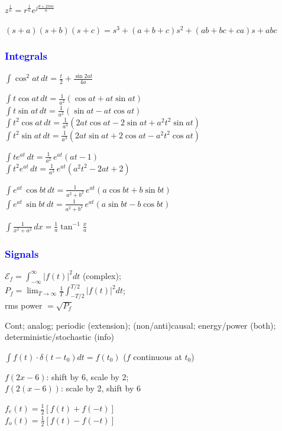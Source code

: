 \documentclass[4pt]{article}
\theoremstyle{definition}
\theoremstyle{definition}
\newcommand{\ra}{\rightarrow}
\newcommand{\blue}[1]{\textcolor{blue}{#1}}
\begin{document}
\begin{landscape}
\begin{multicols}{3}
    $z^{\frac 1 n} = r^{\frac 1 n} e^{j \frac{\theta + 2\pi m}{n}}$

    \((s+a)(s+b)(s+c) = s^3 + (a+b+c) s^2 + (ab+bc+ca)s + abc\)
\subsubsection*{\blue{Integrals}}

    $\int \cos^2 at \, dt = \frac{t}{2} + \frac{\sin2at}{4a}$

    $\int t \cos at \, dt = \frac{1}{a^2}(\cos at + at\sin at)$\\
    $\int t \sin at \, dt = \frac{1}{a^2}(\sin at - at\cos at)$\\
    $\int t^2 \cos at\, dt = \frac{1}{a^3}(2at\cos at - 2\sin at + a^2t^2\sin at)$\\
    $\int t^2 \sin at\, dt = \frac{1}{a^3}(2at\sin at + 2\cos at - a^2t^2\cos at)$

    $\int te^{at}\, dt = \frac{1}{a^2} \, e^{at} (at-1)$\\
    $\int t^2 e^{at} \, dt = \frac{1}{a^3} \, e^{at} (a^2t^2 - 2at + 2)$

    $\int e^{at} \,\cos bt \, dt = \frac{1}{a^2+b^2} \,e^{at}(a\cos bt + b \sin bt)$\\
    $\int e^{at} \,\sin bt \, dt = \frac{1}{a^2+b^2} \,e^{at}(a\sin bt - b \cos bt)$

    \(\int \frac{1} {x^2+a^2}\, dx = \frac{1}{a} \tan^{-1} \frac x a\)
\columnbreak
\subsubsection*{\blue{Signals}}
    $\mathcal{E}_f = \int_{-\infty}^{\infty} |f(t)|^2 dt$ (complex); \\
    $P_f = \lim_{T\ra\infty}\frac{1}{T} \int^{T/2}_{-T/2} |f(t)|^2 dt $; \\
        \hspace{1em} rms power $= \sqrt {P_f}$

    Cont; 
    analog; 
    periodic (extension); 
    (non/anti)causal; 
    energy/power (both); 
    deterministic/stochastic (info)

    $\int f(t) \cdot \delta(t - t_0) dt = f(t_0)$ ($f$ continuous at $t_0$)
    

    $f(2x-6)$: shift by 6, scale by 2;\\
    $f(2(x-6))$: scale by 2, shift by 6

    $f_e(t) = \frac{1}{2}[f(t) + f(-t)]$\\
    $f_o(t) = \frac{1}{2}[f(t) - f(-t)]$

\end{multicols}
\end{landscape}
\end{document}
